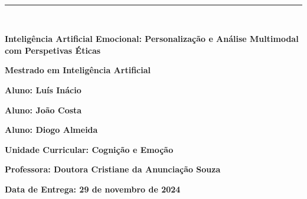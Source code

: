 \documentclass[a4paper,12pt]{report}
\begin{document}
	
	\begin{titlepage}
		\centering
		\vspace*{-2cm} %
		
		\hfill%
		\\[0.5cm]
		
		\noindent
		{\color{barraazul}\rule{\textwidth}{1mm}} %
		\\[1cm]
		
		{\LARGE  \textbf{Inteligência Artificial Emocional: Personalização e Análise Multimodal com Perspetivas Éticas} \par}
		\vspace{1.5cm}
		
		{\Large \textbf{Mestrado em Inteligência Artificial}} \par
		\vspace{3cm}
		
		{\large \textbf{Aluno: Luís Inácio}} \par
		{\large \textbf{Aluno: João Costa}} \par
		{\large \textbf{Aluno: Diogo Almeida}} \par
		
		\vspace{3cm}
		
		{\large \textbf{Unidade Curricular: Cognição e Emoção}} \par
		\vspace{1cm}
		
		{\large \textbf{Professora: Doutora Cristiane da Anunciação Souza}} \par
		\vfill
		
		{\large \textbf{Data de Entrega: 29 de novembro de 2024}} \par
	\end{titlepage}
	
\end{document}
